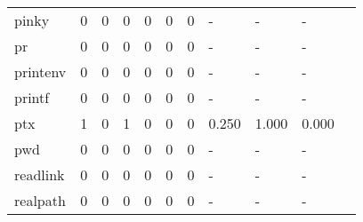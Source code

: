 \begin{longtable}{lp{1.10cm}p{1.10cm}p{1.10cm}p{1.10cm}p{1.10cm}p{1.10cm}p{1.10cm}p{1.10cm}p{1.10cm}p{1.10cm}}
pinky     &                      0 &                                  0 &                                 0 &                                0 &                                 0 &                               0 &                              - &                                     - &                                   - \\
pr        &                      0 &                                  0 &                                 0 &                                0 &                                 0 &                               0 &                              - &                                     - &                                   - \\
printenv  &                      0 &                                  0 &                                 0 &                                0 &                                 0 &                               0 &                              - &                                     - &                                   - \\
printf    &                      0 &                                  0 &                                 0 &                                0 &                                 0 &                               0 &                              - &                                     - &                                   - \\
ptx       &                      1 &                                  0 &                                 1 &                                0 &                                 0 &                               0 &                          0.250 &                                 1.000 &                               0.000 \\
pwd       &                      0 &                                  0 &                                 0 &                                0 &                                 0 &                               0 &                              - &                                     - &                                   - \\
readlink  &                      0 &                                  0 &                                 0 &                                0 &                                 0 &                               0 &                              - &                                     - &                                   - \\
realpath  &                      0 &                                  0 &                                 0 &                                0 &                                 0 &                               0 &                              - &                                     - &                                   - \\

\end{longtable}
